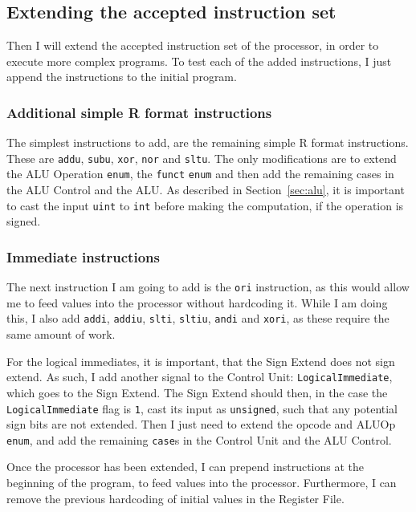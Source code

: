 \subsection{Extending the accepted instruction set}\label{sec:extending}
Then I will extend the accepted instruction set of the processor, in order to
execute more complex programs. To test each of the added instructions, I just
append the instructions to the initial program.

\subsubsection*{Additional simple R format instructions}
The simplest instructions to add, are the remaining simple R format
instructions. These are \texttt{addu}, \texttt{subu}, \texttt{xor},
\texttt{nor} and \texttt{sltu}. The only modifications are to extend the ALU
Operation \texttt{enum}, the \texttt{funct} \texttt{enum} and then add the
remaining cases in the ALU Control and the ALU. As described in
Section~\ref{sec:alu}, it is important to cast the input \texttt{uint} to
\texttt{int} before making the computation, if the operation is signed.

\subsubsection*{Immediate instructions}
The next instruction I am going to add is the \texttt{ori} instruction, as this
would allow me to feed values into the processor without hardcoding it. While
I am doing this, I also add \texttt{addi}, \texttt{addiu}, \texttt{slti},
\texttt{sltiu}, \texttt{andi} and \texttt{xori}, as these require the same
amount of work.

For the logical immediates, it is important, that the Sign Extend does not
sign extend. As such, I add another signal to the Control Unit:
\texttt{LogicalImmediate}, which goes to the Sign Extend. The Sign Extend
should then, in the case the \texttt{LogicalImmediate} flag is \texttt{1}, cast
its input as \texttt{unsigned}, such that any potential sign bits are not
extended. Then I just need to extend the opcode and ALUOp \texttt{enum}, and
add the remaining \texttt{case}s in the Control Unit and the ALU Control.

Once the processor has been extended, I can prepend instructions at the
beginning of the program, to feed values into the processor. Furthermore, I
can remove the previous hardcoding of initial values in the Register File.

